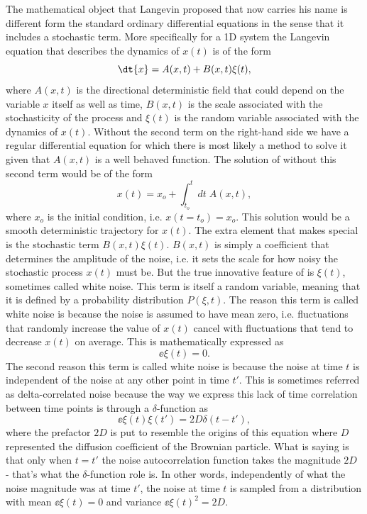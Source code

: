 The mathematical object that Langevin proposed that now carries his name is
different form the standard ordinary differential equations in the sense that
it includes a stochastic term. More specifically for a 1D system the Langevin
equation that describes the dynamics of $x(t)$ is of the form
\begin{equation}
  \dt{x} = A(x, t) + B(x, t) \xi(t),
  \label{eq_langevin}
\end{equation}
where $A(x, t)$ is the directional deterministic field that could depend on the
variable $x$ itself as well as time, $B(x, t)$ is the scale associated with the
stochasticity of the process and $\xi(t)$ is the random variable associated
with the dynamics of $x(t)$. Without the second term on the right-hand side we
have a regular differential equation for which there is most likely a method to
solve it given that $A(x, t)$ is a well behaved function. The solution of 
 without this second term would be of the form
\begin{equation}
  x(t) = x_o + \int_{t_o}^t dt\; A(x, t),
\end{equation}
where $x_o$ is the initial condition, i.e. $x(t = t_o) = x_o$. This solution
would be a smooth deterministic trajectory for $x(t)$. The extra element that
makes  special is the stochastic term $B(x, t) \xi(t)$. 
$B(x, t)$ is simply a coefficient that determines the amplitude of the noise,
i.e. it sets the scale for how noisy the stochastic process $x(t)$ must be. But
the true innovative feature of  is $\xi(t)$, sometimes called
white noise. This term is itself a random variable, meaning that it is defined
by a probability distribution $P(\xi, t)$. The reason this term is called white
noise is because the noise is assumed to have mean zero, i.e. fluctuations that
randomly increase the value of $x(t)$ cancel with fluctuations that tend to
decrease $x(t)$ on average. This is mathematically expressed as
\begin{equation}
  \ee{\xi(t)} = 0.
\end{equation}
The second reason this term is called white noise is because the noise at time
$t$ is independent of the noise at any other point in time $t'$. This is
sometimes referred as delta-correlated noise because the way we express this
lack of time correlation between time points is through a $\delta$-function as
\begin{equation}
  \ee{\xi(t) \xi(t')} = 2D \delta(t - t'),
  \label{eq_noise_delta}
\end{equation}
where the prefactor $2D$ is put to resemble the origins of this equation where
$D$ represented the diffusion coefficient of the Brownian particle. What 
 is saying is that only when $t = t'$ the noise
autocorrelation function takes the magnitude $2D$ - that's what the 
$\delta$-function role is. In other words, independently of what the noise
magnitude was at time $t'$, the noise at time $t$ is sampled from a
distribution with mean $\ee{\xi(t)} = 0$ and variance $\ee{\xi(t)^2} = 2D$.

